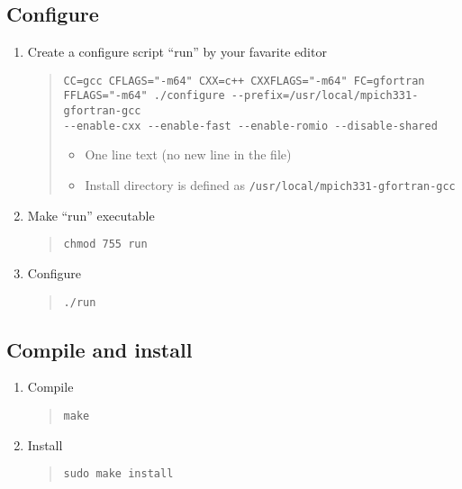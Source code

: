 \documentclass[11pt]{article}
\begin{document}
\subsection{Configure}
\begin{enumerate}
\item
Create a configure script ``run'' by your favarite editor

\begin{quote}
\begin{verbatim}
CC=gcc CFLAGS="-m64" CXX=c++ CXXFLAGS="-m64" FC=gfortran
FFLAGS="-m64" ./configure --prefix=/usr/local/mpich331-gfortran-gcc
--enable-cxx --enable-fast --enable-romio --disable-shared
\end{verbatim}

\begin{itemize}
\item
One line text (no new line in the file)
\item
Install directory is defined as
\verb|/usr/local/mpich331-gfortran-gcc|
\end{itemize}
\end{quote}

\item
Make ``run'' executable 
\begin{quote}
\begin{verbatim}
chmod 755 run
\end{verbatim}
\end{quote}

\item
Configure
\begin{quote}
\begin{verbatim}
./run
\end{verbatim}
\end{quote}
\end{enumerate}

\subsection{Compile and install}
\begin{enumerate}
\item
Compile
\begin{quote}
\begin{verbatim}
make
\end{verbatim}
\end{quote}
\item
Install
\begin{quote}
\begin{verbatim}
sudo make install
\end{verbatim}
\end{quote}
\end{enumerate}
\end{document}

